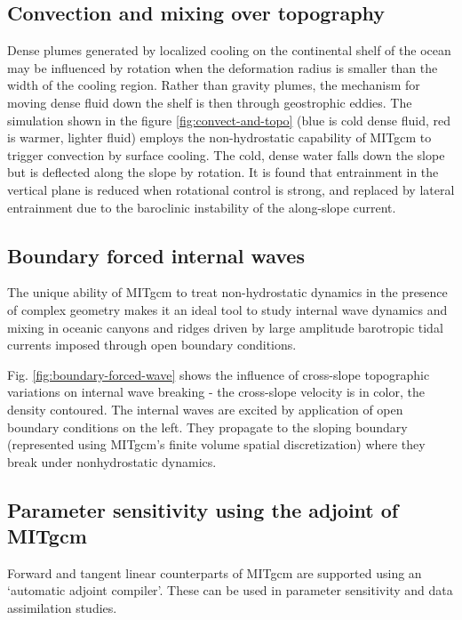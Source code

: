 \subsection{Convection and mixing over topography}

Dense plumes generated by localized cooling on the continental shelf of the
ocean may be influenced by rotation when the deformation radius is smaller
than the width of the cooling region. Rather than gravity plumes, the
mechanism for moving dense fluid down the shelf is then through geostrophic
eddies. The simulation shown in the figure \ref{fig:convect-and-topo}
(blue is cold dense fluid, red is
warmer, lighter fluid) employs the non-hydrostatic capability of MITgcm to
trigger convection by surface cooling. The cold, dense water falls down the
slope but is deflected along the slope by rotation. It is found that
entrainment in the vertical plane is reduced when rotational control is
strong, and replaced by lateral entrainment due to the baroclinic
instability of the along-slope current.



\subsection{Boundary forced internal waves}

The unique ability of MITgcm to treat non-hydrostatic dynamics in the
presence of complex geometry makes it an ideal tool to study internal wave
dynamics and mixing in oceanic canyons and ridges driven by large amplitude
barotropic tidal currents imposed through open boundary conditions.

Fig. \ref{fig:boundary-forced-wave} shows the influence of cross-slope 
topographic variations on
internal wave breaking - the cross-slope velocity is in color, the density
contoured. The internal waves are excited by application of open boundary
conditions on the left. They propagate to the sloping boundary (represented
using MITgcm's finite volume spatial discretization) where they break under
nonhydrostatic dynamics.



\subsection{Parameter sensitivity using the adjoint of MITgcm}

Forward and tangent linear counterparts of MITgcm are supported using an
`automatic adjoint compiler'. These can be used in parameter sensitivity and
data assimilation studies.

